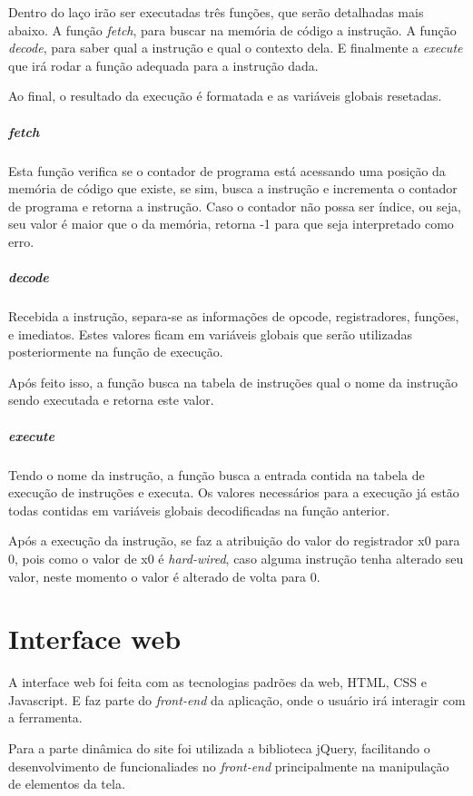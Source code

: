 					Dentro do laço irão ser executadas três funções, que serão detalhadas mais abaixo. A função \textit{fetch}, para buscar na memória de código a instrução. A função \textit{decode}, para saber qual a instrução e qual o contexto dela. E finalmente a \textit{execute} que irá rodar a função adequada para a instrução dada.

					Ao final, o resultado da execução é formatada e as variáveis globais resetadas.

				\subparagraph{fetch}
				
					Esta função verifica se o contador de programa está acessando uma posição da memória de código que existe, se sim, busca a instrução e incrementa o contador de programa e retorna a instrução. Caso o contador não possa ser índice, ou seja, seu valor é maior que o da memória, retorna -1 para que seja interpretado como erro.

				\subparagraph{decode}
					
					Recebida a instrução, separa-se as informações de opcode, registradores, funções, e imediatos. Estes valores ficam em variáveis globais que serão utilizadas posteriormente na função de execução.

					Após feito isso, a função busca na tabela de instruções qual o nome da instrução sendo executada e retorna este valor.


				\subparagraph{execute}
			
					Tendo o nome da instrução, a função busca a entrada contida na tabela de execução de instruções e executa. Os valores necessários para a execução já estão todas contidas em variáveis globais decodificadas na função anterior.

					Após a execução da instrução, se faz a atribuição do valor do registrador x0 para 0, pois como o valor de x0 é \textit{hard-wired}, caso alguma instrução tenha alterado seu valor, neste momento o valor é alterado de volta para 0.



\section{Interface web}

	A interface web foi feita com as tecnologias padrões da web, HTML, CSS e Javascript. E faz parte do \textit{front-end} da aplicação, onde o usuário irá interagir com a ferramenta. 

	Para a parte dinâmica do site foi utilizada a biblioteca jQuery, facilitando o desenvolvimento de funcionaliades no \textit{front-end} principalmente na manipulação de elementos da tela. 

